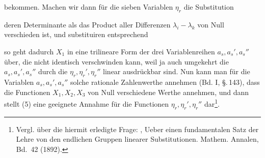 bekommen. Machen wir dann für die sieben Variablen $\eta_r$ die Substitution


deren Determinante als das Product aller Differenzen $\lambda_i - \lambda_k$ von Null verschieden ist, und substituiren entsprechend


so geht dadurch $X_1$ in eine trilineare Form der drei Variablenreihen $a_s, a_s', a_s''$ über, die nicht identisch verschwinden kann, weil ja auch umgekehrt die $a_s, a_s', a_s''$ durch die $\eta_r, \eta_r', \eta_r''$ linear ausdrückbar sind. Nun kann man für die Variablen $a_s, a_s', a_s''$ solche rationale Zahlenwerthe annehmen (Bd. I, §.\,143), dass die Functionen $X_1, X_2, X_3$ von Null verschiedene Werthe annehmen, und dann stellt (5) eine geeignete Annahme für die Functionen $\eta_r, \eta_r', \eta_r''$ dar\footnote{Vergl. über die hiermit erledigte Frage: , \glqq Ueber einen fundamentalen Satz der Lehre von den endlichen Gruppen linearer Substitutionen\grqq{}. Mathem. Annalen, Bd.\ 42 (1892).}.
